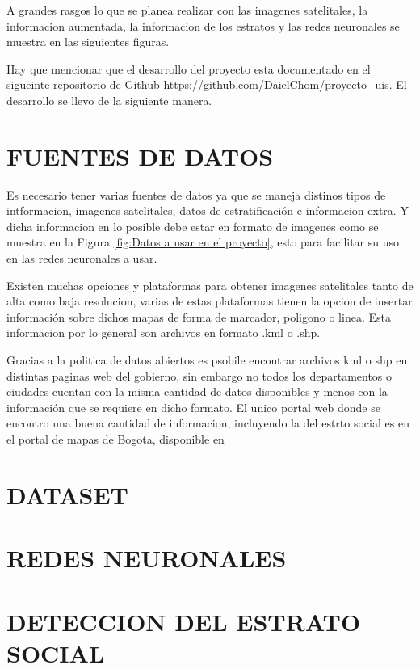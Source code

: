 A grandes rasgos lo que se planea realizar con las imagenes satelitales, la informacion aumentada, la informacion de los estratos y las redes neuronales se muestra en las siguientes figuras.


Hay que mencionar que el desarrollo del proyecto esta documentado en el sigueinte repositorio de Github \url{https://github.com/DaielChom/proyecto_uis}. El desarrollo se llevo de la siguiente manera.
 
 \section{FUENTES DE DATOS}
 
 Es necesario tener varias fuentes de datos ya que se maneja distinos tipos de intformacion, imagenes satelitales, datos de estratificación e informacion extra. Y dicha informacion en lo posible debe estar en formato de imagenes como se muestra en la Figura \ref{fig:Datos a usar en el proyecto}, esto para facilitar su uso en las redes neuronales a usar.
 
 Existen muchas opciones y plataformas para obtener imagenes satelitales tanto de alta como baja resolucion, varias de estas plataformas tienen la opcion de insertar información sobre dichos mapas de forma de marcador, poligono o linea. Esta informacion por lo general son archivos en formato .kml o .shp.
 
 Gracias a la politica de datos abiertos{} es psobile encontrar archivos kml o shp en distintas paginas web del gobierno, sin embargo no todos los departamentos o ciudades cuentan con la misma cantidad de datos disponibles y menos con la información que se requiere en dicho formato. El unico portal web donde se encontro una buena cantidad de informacion, incluyendo la del estrto social es en el portal de mapas de Bogota, disponible en
 
 
 \section{DATASET} 
 \section{REDES NEURONALES}
 \section{DETECCION DEL ESTRATO SOCIAL}
